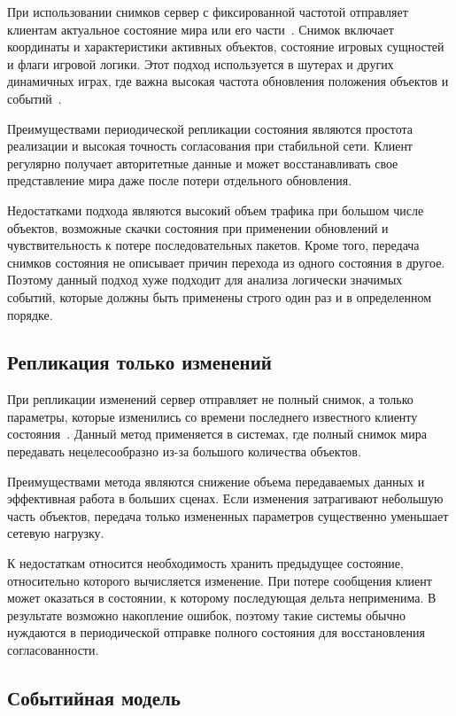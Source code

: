 При использовании снимков сервер с фиксированной частотой отправляет клиентам актуальное состояние мира или его части~\cite{valvesource}. Снимок включает координаты и характеристики активных объектов, состояние игровых сущностей и флаги игровой логики. Этот подход используется в шутерах и других динамичных играх, где важна высокая частота обновления положения объектов и событий~\cite{unity_netcode_docs}.

Преимуществами периодической репликации состояния являются простота реализации и высокая точность согласования при стабильной сети. Клиент регулярно получает авторитетные данные и может восстанавливать свое представление мира даже после потери отдельного обновления.

Недостатками подхода являются высокий объем трафика при большом числе объектов, возможные скачки состояния при применении обновлений и чувствительность к потере последовательных пакетов. Кроме того, передача снимков состояния не описывает причин перехода из одного состояния в другое. Поэтому данный подход хуже подходит для анализа логически значимых событий, которые должны быть применены строго один раз и в определенном порядке.

\subsection{Репликация только изменений}

При репликации изменений сервер отправляет не полный снимок, а только параметры, которые изменились со времени последнего известного клиенту состояния~\cite{unreal_replicate}. Данный метод применяется в системах, где полный снимок мира передавать нецелесообразно из-за большого количества объектов.

Преимуществами метода являются снижение объема передаваемых данных и эффективная работа в больших сценах. Если изменения затрагивают небольшую часть объектов, передача только измененных параметров существенно уменьшает сетевую нагрузку.

К недостаткам относится необходимость хранить предыдущее состояние, относительно которого вычисляется изменение. При потере сообщения клиент может оказаться в состоянии, к которому последующая дельта неприменима. В результате возможно накопление ошибок, поэтому такие системы обычно нуждаются в периодической отправке полного состояния для восстановления согласованности.

\subsection{Событийная модель}

